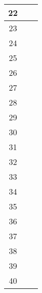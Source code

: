 \documentclass[12pt]{article}
\begin{document}
\begin{longtable}{|c|p{10cm}|p{5.5cm}|}
        22 & \rule{0pt}{1.2cm} & \\
        \hline
        23 & \rule{0pt}{1.2cm} & \\
        \hline
        24 & \rule{0pt}{1.2cm} & \\
        \hline
        25 & \rule{0pt}{1.2cm} & \\
        \hline
        26 & \rule{0pt}{1.2cm} & \\
        \hline
        27 & \rule{0pt}{1.2cm} & \\
        \hline
        28 & \rule{0pt}{1.2cm} & \\
        \hline
        29 & \rule{0pt}{1.2cm} & \\
        \hline
        30 & \rule{0pt}{1.2cm} & \\
        \hline
        31 & \rule{0pt}{1.2cm} & \\
        \hline
        32 & \rule{0pt}{1.2cm} & \\
        \hline
        33 & \rule{0pt}{1.2cm} & \\
        \hline
        34 & \rule{0pt}{1.2cm} & \\
        \hline
        35 & \rule{0pt}{1.2cm} & \\
        \hline
        36 & \rule{0pt}{1.2cm} & \\
        \hline
        37 & \rule{0pt}{1.2cm} & \\
        \hline
        38 & \rule{0pt}{1.2cm} & \\
        \hline
        39 & \rule{0pt}{1.2cm} & \\
        \hline
        40 & \rule{0pt}{1.2cm} & \\
        \hline

    \end{longtable}
\end{document}
